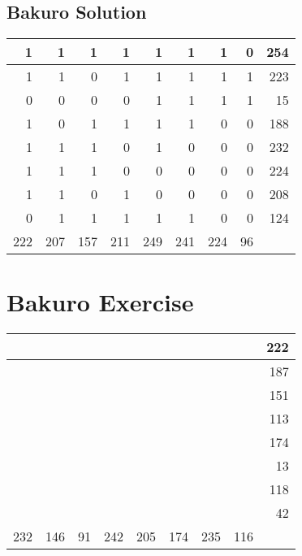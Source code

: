 \documentclass[]{article}
\begin{document}
 \subsection{Bakuro Solution} 
\begin{tabular}{rrrrrrrrr}
\hline
   1 &   1 &   1 &   1 &   1 &   1 &   1 &  0 & 254 \\ \hline
   1 &   1 &   0 &   1 &   1 &   1 &   1 &  1 & 223 \\ \hline
   0 &   0 &   0 &   0 &   1 &   1 &   1 &  1 &  15 \\ \hline
   1 &   0 &   1 &   1 &   1 &   1 &   0 &  0 & 188 \\ \hline
   1 &   1 &   1 &   0 &   1 &   0 &   0 &  0 & 232 \\ \hline
   1 &   1 &   1 &   0 &   0 &   0 &   0 &  0 & 224 \\ \hline
   1 &   1 &   0 &   1 &   0 &   0 &   0 &  0 & 208 \\ \hline
   0 &   1 &   1 &   1 &   1 &   1 &   0 &  0 & 124 \\ \hline
 222 & 207 & 157 & 211 & 249 & 241 & 224 & 96 &     \\ \hline
\hline
\end{tabular}\newpage\section{Bakuro Exercise}\begin{tabular}{rrrrrrrrr}
\hline
     &     &    &     &     &     &     &     & 222 \\ \hline
     &     &    &     &     &     &     &     & 187 \\ \hline
     &     &    &     &     &     &     &     & 151 \\ \hline
     &     &    &     &     &     &     &     & 113 \\ \hline
     &     &    &     &     &     &     &     & 174 \\ \hline
     &     &    &     &     &     &     &     &  13 \\ \hline
     &     &    &     &     &     &     &     & 118 \\ \hline
     &     &    &     &     &     &     &     &  42 \\ \hline
 232 & 146 & 91 & 242 & 205 & 174 & 235 & 116 &     \\ \hline
\hline
\end{tabular}\newpage 
\end{document}
